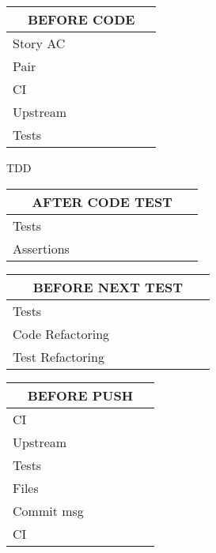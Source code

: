 \documentclass[10pt, twocolumn]{article}
\newenvironment{checklist}[1]{%
  \renewcommand{\item}[2]{%
    ##1\hspace{2em}\dotfill\makebox{\uppercase{##2}}\\
  }
  \newcommand{\step}[1]{%
    \hspace*{10em}-\hspace*{\labelsep}##1\\
  }
  \begin{tabular}{p{0.8\linewidth}}
     \toprule
       \multicolumn{1}{c}{\textbf{\uppercase{#1}}}\\
     \midrule
}{\bottomrule\end{tabular}\vspace{1em}}
\begin{document}
\begin{checklist}{before code}
  \item{Story AC}{check}
  \item{Pair}{briefed}
  \item{CI}{green}
  \item{Upstream}{pull/update}
  \item{Tests}{full set -- green}
\end{checklist}

\begin{task}{TDD}

  \begin{checklist}{after code test}
    \item{Tests}{red}
    \item{Assertions}{one}
  \end{checklist}

  \begin{checklist}{before next test}
    \item{Tests}{full set -- green}
    \item{Code Refactoring}{done}
    \item{Test Refactoring}{done}
  \end{checklist}

\end{task}

\begin{checklist}{before push}
  \item{CI}{green}
  \item{Upstream}{pull/update}
  \item{Tests}{full set -- green}
  \item{Files}{added/stashed}
  \item{Commit msg}{reviewed}
  \item{CI}{green}
\end{checklist}
\end{document}
